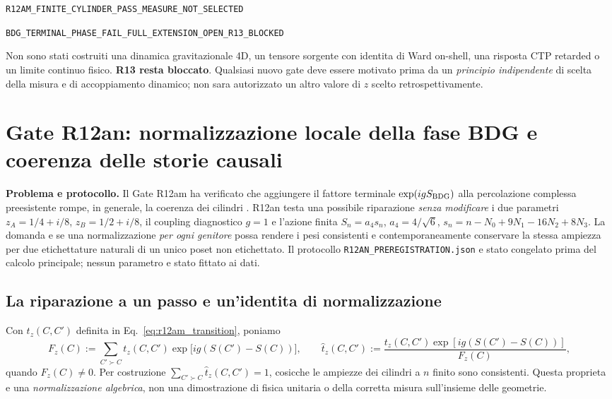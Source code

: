 \documentclass[11pt,a4paper]{article}
\begin{document}
\begin{center}\small\texttt{R12AM\_FINITE\_CYLINDER\_PASS\_MEASURE\_NOT\_SELECTED}\end{center}
\begin{center}\small\texttt{BDG\_TERMINAL\_PHASE\_FAIL\_FULL\_EXTENSION\_OPEN\_R13\_BLOCKED}\end{center}
Non sono stati costruiti una dinamica gravitazionale 4D, un tensore sorgente con identita di Ward on-shell, una risposta CTP retarded o un limite continuo fisico. \textbf{R13 resta bloccato}. Qualsiasi nuovo gate deve essere motivato prima da un \emph{principio indipendente} di scelta della misura e di accoppiamento dinamico; non sara autorizzato un altro valore di $z$ scelto retrospettivamente.


\section{Gate R12an: normalizzazione locale della fase BDG e coerenza delle storie causali}
\label{sec:r12an}

\textbf{Problema e protocollo.} Il Gate R12am ha verificato che aggiungere il fattore terminale $\exp(igS_{\rm BDG})$ alla percolazione complessa preesistente rompe, in generale, la coerenza dei cilindri \cite{Gudder2012QuantumGrowth,DowkerJohnstonSurya2010}. R12an testa una possibile riparazione \emph{senza modificare} i due parametri $z_A=1/4+i/8$, $z_B=1/2+i/8$, il coupling diagnostico $g=1$ e l'azione finita $S_n=a_4s_n$, $a_4=4/\sqrt 6$, $s_n=n-N_0+9N_1-16N_2+8N_3$. La domanda e se una normalizzazione \emph{per ogni genitore} possa rendere i pesi consistenti e contemporaneamente conservare la stessa ampiezza per due etichettature naturali di un unico poset non etichettato. Il protocollo \texttt{R12AN\_PREREGISTRATION.json} e stato congelato prima del calcolo principale; nessun parametro e stato fittato ai dati.

\subsection{La riparazione a un passo e un'identita di normalizzazione}
Con $t_z(C,C')$ definita in Eq.~\eqref{eq:r12am_transition}, poniamo
\begin{equation}
 F_z(C):=\sum_{C'\succ C}t_z(C,C')\exp\!\bigl[ig(S(C')-S(C))\bigr], \qquad
 \widehat t_z(C,C'):=\frac{t_z(C,C')\exp[ig(S(C')-S(C))]}{F_z(C)},
 \label{eq:r12an_local_transfer}
\end{equation}
quando $F_z(C)\neq0$. Per costruzione $\sum_{C'\succ C}\widehat t_z(C,C')=1$, cosicche le ampiezze dei cilindri a $n$ finito sono consistenti. Questa proprieta e una \emph{normalizzazione algebrica}, non una dimostrazione di fisica unitaria o della corretta misura sull'insieme delle geometrie.
\end{document}
